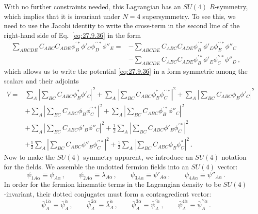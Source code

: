 With no further constraints needed, this Lagrangian has an \(SU(4)\)
\(R\)-symmetry, which implies that it is invariant under \(N=4\)
supersymmetry. To see this, we need to use the Jacobi identity to write the
cross-term in the second line of the right-hand side of Eq.~\eqref{eq:27.9.36}
in the form
\[
  \begin{aligned}
  \sum_{ABCDE}C_{ABC}C_{ADE}
    \phi_B^{\prime *}\phi'_C\phi_D^{\prime\prime *}\phi''_E
  ={}&
  -\sum_{ABCDE}C_{ABC}C_{ADE}
    \phi_B^{\prime *}\phi'_D\phi_E^{\prime\prime *}\phi''_C
  \\
  &-\sum_{ABCDE}C_{ABC}C_{ADE}
    \phi_B^{\prime *}\phi'_E\phi_C^{\prime\prime *}\phi''_D\,,
  \end{aligned}
\]
which allows us to write the potential \eqref{eq:27.9.36} in a form symmetric
among the scalars and their adjoints
\begin{equation}
  \begin{aligned}
  V={}&
  \sum_A\left|\sum_{BC}C_{ABC}\phi_B^*\phi'_C\right|^2
  +\sum_A\left|\sum_{BC}C_{ABC}\phi_B^*\phi_C^{\prime\prime *}\right|^2
  +\sum_A\left|\sum_{BC}C_{ABC}\phi_B\phi'_C\right|^2
  \\
  &+\sum_A\left|\sum_{BC}C_{ABC}\phi_B\phi_C^{\prime\prime *}\right|^2
  +\sum_A\left|\sum_{BC}C_{ABC}\phi_B^{\prime *}\phi''_C\right|^2
  \\
  &+\sum_A\left|\sum_{BC}C_{ABC}\phi'_B\phi''_C\right|^2
  +\frac12\sum_A\left|\sum_{BC}C_{ABC}\phi'_B\phi_C^{\prime *}\right|^2
  \\
  &+\frac12\sum_A\left|\sum_{BC}C_{ABC}\phi''_B
    \phi_C^{\prime\prime *}\right|^2
  +\frac12\sum_A\left|\sum_{BC}C_{ABC}\phi_B\phi_C^*\right|^2\,.
  \end{aligned}
  \tag{27.9.37}\label{eq:27.9.37}
\end{equation}
Now to make the \(SU(4)\) symmetry apparent, we introduce an \(SU(4)\)
notation for the fields. We assemble the undotted fermion fields into an
\(SU(4)\) vector:
\begin{equation}
  \psi_{1A\alpha}\equiv\psi_{A\alpha}\,,
  \qquad
  \psi_{2A\alpha}\equiv\lambda_{A\alpha}\,,
  \qquad
  \psi_{3A\alpha}\equiv\psi'_{A\alpha}\,,
  \qquad
  \psi_{4A\alpha}\equiv\psi''_{A\alpha}\,.
  \tag{27.9.38}\label{eq:27.9.38}
\end{equation}
In order for the fermion kinematic terms in the Lagrangian density to be
\(SU(4)\)-invariant, their dotted conjugates must form a contragredient
vector:
\begin{equation}
  \bar\psi_A^{1\dot\alpha}\equiv\bar\psi_A^{\dot\alpha}\,,
  \qquad
  \bar\psi_A^{2\dot\alpha}\equiv\bar\lambda_A^{\dot\alpha}\,,
  \qquad
  \bar\psi_A^{3\dot\alpha}\equiv\bar\psi_A^{\prime\dot\alpha}\,,
  \qquad
  \bar\psi_A^{4\dot\alpha}\equiv\bar\psi_A^{\prime\prime\dot\alpha}\,.
  \tag{27.9.39}\label{eq:27.9.39}
\end{equation}
